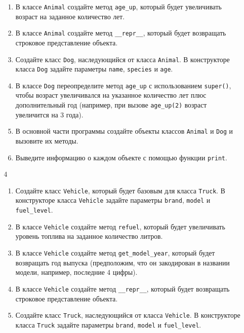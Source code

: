 \begin{enumerate}
\begin{enumerate}[leftmargin=*]
    \item В классе \texttt{Animal} создайте метод \texttt{age\_up}, который будет увеличивать возраст на заданное количество лет.
    
    \item В классе \texttt{Animal} создайте метод \texttt{\_\_repr\_\_}, который будет возвращать строковое представление объекта.
    
    \item Создайте класс \texttt{Dog}, наследующийся от класса \texttt{Animal}. В конструкторе класса \texttt{Dog} задайте параметры \texttt{name}, \texttt{species} и \texttt{age}.
    
    \item В классе \texttt{Dog} переопределите метод \texttt{age\_up} с использованием \texttt{super()}, чтобы возраст увеличивался на указанное количество лет плюс дополнительный год (например, при вызове \texttt{age\_up(2)} возраст увеличится на 3 года).
    
    \item В основной части программы создайте объекты классов \texttt{Animal} и \texttt{Dog} и вызовите их методы.
    
    \item Выведите информацию о каждом объекте с помощью функции \texttt{print}.
\end{enumerate}

\item[4] 
\begin{enumerate}[leftmargin=*]
    \item Создайте класс \texttt{Vehicle}, который будет базовым для класса \texttt{Truck}. В конструкторе класса \texttt{Vehicle} задайте параметры \texttt{brand}, \texttt{model} и \texttt{fuel\_level}.
    
    \item В классе \texttt{Vehicle} создайте метод \texttt{refuel}, который будет увеличивать уровень топлива на заданное количество литров.
    
    \item В классе \texttt{Vehicle} создайте метод \texttt{get\_model\_year}, который будет возвращать год выпуска (предположим, что он закодирован в названии модели, например, последние 4 цифры).
    
    \item В классе \texttt{Vehicle} создайте метод \texttt{\_\_repr\_\_}, который будет возвращать строковое представление объекта.
    
    \item Создайте класс \texttt{Truck}, наследующийся от класса \texttt{Vehicle}. В конструкторе класса \texttt{Truck} задайте параметры \texttt{brand}, \texttt{model} и \texttt{fuel\_level}.
    

\end{enumerate}
\end{enumerate}
